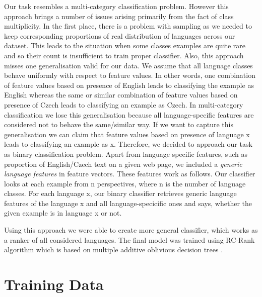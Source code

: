 \documentclass{acm_proc_article-sp}
\begin{document}
  Our task resembles a multi-category classification problem. 
  However this approach brings a number of issues arising primarily from the fact of class multiplicity. 
  In the first place, there is a problem with sampling as we needed to keep corresponding proportions 
  of real distribution of languages across our dataset. 
  This leads to the situation when some classes examples are quite rare and so their count is insufficient 
  to train proper classifier. Also, this approach misses one generalisation valid for our data.
  We assume that all language classes behave uniformly with respect to feature values. In other words, 
  one combination of feature values based on presence of English leads to classifying the example as English whereas 
  the same or similar combination of feature values based on presence of Czech leads to classifying an example as Czech.
  In multi-category classification we lose this generalisation because all language-specific features are considered
  not to behave the same/similar way. If we want to capture this generalisation we can claim that feature values based on 
  presence of language x leads to classifying an example as x. Therefore, we decided to approach our task as binary 
  classification problem. Apart from language specific features, such as proportion of English/Czech text on a given 
  web page, we included a \textit{generic language features} in feature vectors. These features work as follows.
  Our classifier looks at each example from n perspectives, where n is the number of language classes. 
  For each language x, our binary classifier retrieves generic language features of the language x and all language-specicific
  ones and says, whether the given example is in language x or not. 
  
  Using this approach we were able to create more general classifier, which works as a ranker of all considered languages. 
  The final model was trained using RC-Rank algorithm which is based on multiple additive oblivious decision trees \cite{maimon:datamining}. 

  \section{Training Data}
\end{document}
